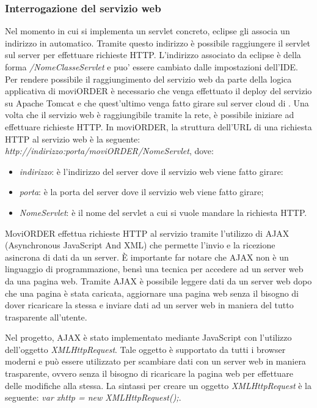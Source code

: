 \subsubsection{Interrogazione del servizio web}

Nel momento in cui si implementa un servlet concreto, eclipse gli associa un indirizzo in automatico. Tramite questo indirizzo è possibile raggiungere il servlet sul server per effettuare richieste HTTP. L'indirizzo associato da eclipse è della forma \textit{/NomeClasseServlet} e puo' essere cambiato dalle impostazioni dell'IDE. Per rendere possibile il raggiungimento del servizio web da parte della logica applicativa di moviORDER è necessario che venga effettuato il deploy del servizio su Apache Tomcat e che quest'ultimo venga fatto girare sul server cloud di \visione{}. Una volta che il servizio web è raggiungibile tramite la rete, è possibile iniziare ad effettuare richieste HTTP. In moviORDER, la struttura dell'URL di una richiesta HTTP al servizio web è la seguente: \textit{http://indirizzo:porta/moviORDER/NomeServlet}, dove:
\begin{itemize}
	\item \textit{indirizzo}: è l'indirizzo del server dove il servizio web viene fatto girare:
	\item \textit{porta}: è la porta del server dove il servizio web viene fatto girare;
	\item \textit{NomeServlet}: è il nome del servlet a cui si vuole mandare la richiesta HTTP.
\end{itemize}

MoviORDER effettua richieste HTTP al servizio tramite l'utilizzo di AJAX (Asynchronous JavaScript And XML) che permette l'invio e la ricezione asincrona di dati da un server. È importante far notare che AJAX non è un linguaggio di programmazione, bensì una tecnica per accedere ad un server web da una pagina web. Tramite AJAX è possibile leggere dati da un server web dopo che una pagina è stata caricata, aggiornare una pagina web senza il bisogno di dover ricaricare la stessa e inviare dati ad un server web in maniera del tutto trasparente all'utente. 

Nel progetto, AJAX è stato implementato mediante JavaScript con l'utilizzo dell'oggetto \textit{XMLHttpRequest}. Tale oggetto è supportato da tutti i browser moderni e può essere utilizzato per scambiare dati con un server web in maniera trasparente, ovvero senza il bisogno di ricaricare la pagina web per effettuare delle modifiche alla stessa. La sintassi per creare un oggetto \textit{XMLHttpRequest} è la seguente:
\textit{var xhttp = new XMLHttpRequest();}. 


